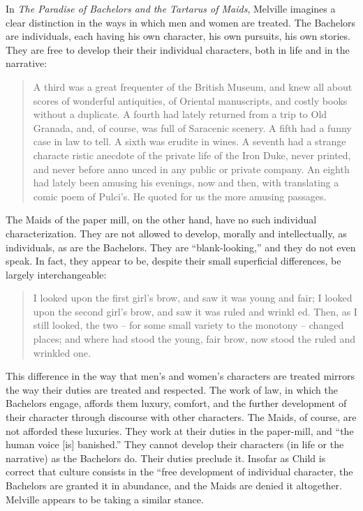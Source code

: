 \documentclass[man,12pt,natbib]{apa6}
\begin{document}
In \emph{The Paradise of Bachelors and the Tartarus of Maids}, Melville
imagines a clear distinction in the ways in which men and women are treated.
The Bachelors are individuals, each having his own character, his own pursuits,
his own stories. They are free to develop their their individual characters,
both in life and in the narrative:
\begin{quote}
	A third was a great frequenter of the British Museum, and knew all about
	scores of wonderful antiquities, of Oriental manuscripts, and costly books
	without a duplicate.  A fourth had lately returned from a trip to Old
	Granada, and, of course, was full of Saracenic scenery. A fifth had a funny
	case in law to tell. A sixth was erudite in wines. A seventh had a strange
	characte ristic anecdote of the private life of the Iron Duke, never
	printed, and never before anno unced in any public or private company. An
	eighth had lately been amusing his evenings, now and then, with translating
	a comic poem of Pulci's. He quoted for us the more amusing passages. 
\end{quote}

The Maids of the paper mill, on the other hand, have no such individual
characterization. They are not allowed to develop, morally and intellectually,
as individuals, as are the Bachelors. They are ``blank-looking,'' and they do
not even speak. In fact, they appear to be, despite their small superficial differences, be largely interchangeable:
\begin{quote}
	   I looked upon the first girl's brow, and saw it was young and fair; I
	   looked upon the second girl's brow, and saw it was ruled and wrinkl ed.
	   Then, as I still looked, the two -- for some small variety to the
	   monotony -- changed places; and where had stood the young, fair brow,
	   now stood the ruled and wrinkled one. 
\end{quote}

This difference in the way that men's and women's characters are treated
mirrors the way their duties are treated and respected. The work of law, in
which the Bachelors engage, affords them luxury, comfort, and the further
development of their character through discourse with other characters. The
Maids, of course, are not afforded these luxuries. They work at their duties in
the paper-mill, and ``the human voice [is] banished.'' They cannot develop
their characters (in life or the narrative) as the Bachelors do. Their duties
preclude it.  Insofar as Child is correct that culture consists in the ``free
development of individual character, the Bachelors are granted it in abundance,
and the Maids are denied it altogether. Melville appears to be taking a similar
stance.
\end{document}
